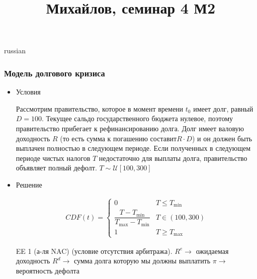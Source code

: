 \documentclass{article}
\begin{document}
\title{\foreignlanguage{russian}{Михайлов, семинар 4 М2}}
\maketitle
\begin{otherlanguage*}{russian}
\subsubsection*{Модель долгового кризиса}
\begin{itemize}
\item Условия

Рассмотрим правительство, которое в момент времени $t_0$ имеет долг, равный $ D =100 $. Текущее сальдо
государственного бюджета нулевое, поэтому правительство прибегает к рефинансированию долга.
Долг имеет валовую доходность $ R $ (то есть сумма к погашению составит$ R \cdot D $) и он должен быть выплачен
полностью в следующем периоде. Если полученных в следующем периоде чистых налогов $ T $  недостаточно
для выплаты долга, правительство объявляет полный дефолт. $ T \sim \mathcal{U}[100, 300] $ 
\item Решение

\begin{align*}
CDF (t) = \begin{cases}
0 & T \le T_{\min} \\
\dfrac{T - T_{\min}}{T_{\max} - T_{\min}}   & T \in (100, 300) \\
1 & T \ge T_{\text{max}}  
\end{cases} 
\end{align*}

EE 1 (а-ля NAC) (условие отсутствия арбитража). 
$ R^e \rightarrow $ ожидаемая доходность 
$ R^d \rightarrow $ сумма долга которую мы должны выплатить
$ \pi \rightarrow $ вероятность дефолта 


\end{itemize}
\end{otherlanguage*}
\end{document}
